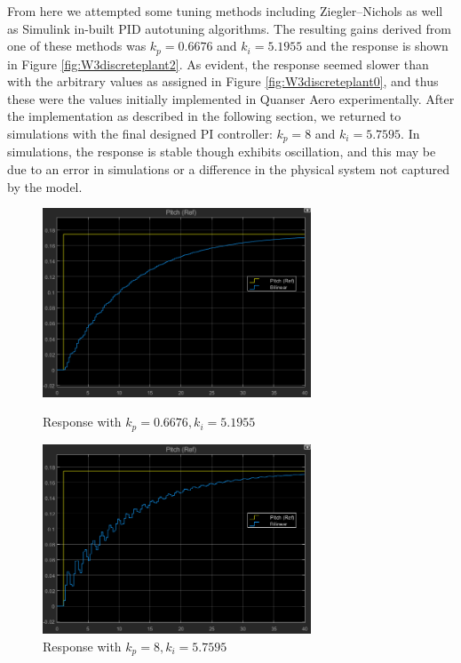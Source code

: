 \documentclass[11pt]{article}
\begin{document}
From here we attempted some tuning methods including Ziegler–Nichols as well as Simulink in-built PID autotuning algorithms. The resulting gains derived from one of these methods was $k_p = 0.6676$ and $k_i = 5.1955$ and the response is shown in Figure \ref{fig:W3discreteplant2}. As evident, the response seemed slower than with the arbitrary values as assigned in Figure \ref{fig:W3discreteplant0}, and thus these were the values initially implemented in Quanser Aero experimentally. After the implementation as described in the following section, we returned to simulations with the final designed PI controller: $k_p = 8$ and $k_i = 5.7595$. In simulations, the response is stable though exhibits oscillation, and this may be due to an error in simulations or a difference in the physical system not captured by the model. \\

\begin{figure}[H]
\begin{minipage}{.5\textwidth}
    \centering
    \includegraphics[width=8cm]{plots/discreteplant_sim_ki5_1955_kp0_6676.png}
    \caption{\small{Response with $k_{p}=0.6676, k_{i}=5.1955$}}
    \label{fig:W3discreteplant2}
\end{minipage}%
\begin{minipage}{.5\textwidth}
    \centering
    \includegraphics[width=8cm]{plots/discreteplant_sim_ki5_7595_kp8.png}
    \caption{\small{Response with $k_{p}=8, k_{i}=5.7595$}}
    \label{fig:W3discreteplant3}
\end{minipage}
\end{figure}
\end{document}
